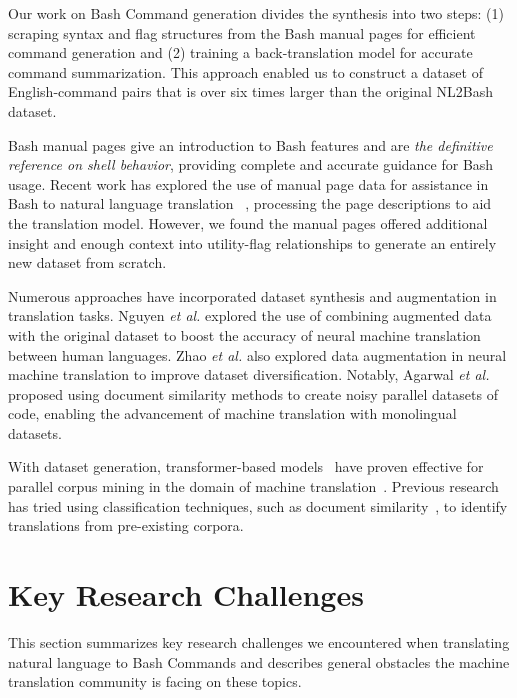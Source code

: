 \documentclass{river-journal}
\begin{document}
Our work on Bash Command generation divides the synthesis into two steps: (1) scraping syntax and flag structures from the Bash manual pages for efficient command generation and (2) training a back-translation model for accurate command summarization. This approach enabled us to construct a dataset of English-command pairs that is over six times larger than the original NL2Bash dataset.

Bash manual pages give an introduction to Bash features and are \textit{the definitive reference on shell behavior}\cite{bashman}, providing complete and accurate guidance for Bash usage. Recent work has explored the use of manual page data for assistance in Bash to natural language translation ~\cite{bharadwaj-shevade-2021-explainable}, processing the page descriptions to aid the translation model. However, we found the manual pages offered additional insight and enough context into utility-flag relationships to generate an entirely new dataset from scratch.

Numerous approaches have incorporated dataset synthesis and augmentation in translation tasks. Nguyen \textit{et al.} \cite{nguyen2020data} explored the use of combining augmented data with the original dataset to boost the accuracy of neural machine translation between human languages. Zhao \textit{et al.} \cite{zhao-etal-2020-active} also explored data augmentation in neural machine translation to improve dataset diversification. Notably, Agarwal \textit{et al.} \cite{agarwal2021using} proposed using document similarity methods to create noisy parallel datasets of code, enabling the advancement of machine translation with monolingual datasets.

With dataset generation, transformer-based models~\cite{li2023text} have proven effective for parallel corpus mining in the domain of machine translation~\cite{DBLP:journals/corr/abs-2002-08155}. Previous research has tried using classification techniques, such as document similarity~\cite{agarwal2021using}, to identify translations from pre-existing corpora. 

\section{Key Research Challenges}
\label{keyChallenge}
This section summarizes key research challenges we encountered when translating natural language to Bash Commands and describes general obstacles the machine translation community is facing on these topics.
\end{document}
